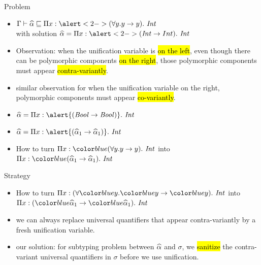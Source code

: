 \documentclass{beamer}
\begin{document}
\begin{frame}{Problem}
  \begin{itemize}
    \item $\tpresub \genA \lt \bpi x {\alert<2->{(\forall y .y \to y)}} \Int$\\
      with solution $\genA = \bpi x {\alert<2->{(\Int \to Int)}} \Int$
    \item<2-> Observation:
      when the unification variable is \hl{on the left},
      even though there can be polymorphic components \hl{on the right},
      those polymorphic components must appear \hl{contra-variantly}.
    \item<3-> similar observation for when the unification variable on the right,
      polymorphic components must appear \hl{co-variantly}.
    \item<4-> $\genA = \bpi x {\alert{(\Bool \to \Bool)}} \Int$
    \item<5-> $\genA = \bpi x {\alert{(\genA_1 \to \genA_1)}} \Int$
    \item<6-> How to turn $\bpi x {\hl{(\forall y .y \to y)}} \Int$
      into $\bpi x {\hl{(\genA_1 \to \genA_1)}} \Int$
  \end{itemize}
\end{frame}

\begin{frame}{Strategy}
  \begin{itemize}
  \item How to turn $\bpi x {(\forall \hl{y} .\hl{y} \to \hl{y})} \Int$
    into $\bpi x {(\hl{\genA_1} \to \hl{\genA_1})} \Int$
  \item we can always replace universal quantifiers that appear contra-variantly
    by a fresh unification variable.
  \item<2-> our solution: for subtyping problem between $\widehat{\alpha}$ and $\sigma$, we
      \hl{sanitize} the contra-variant universal quantifiers in $\sigma$ before we
      use unification.
  \end{itemize}
\end{frame}
\end{document}
